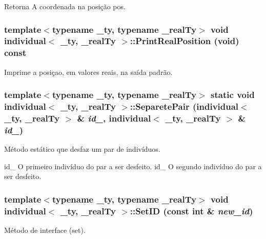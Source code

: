 \begin{DoxyReturn}{Retorna}
A coordenada na posição pos. 
\end{DoxyReturn}
\hypertarget{classindividual_a19b73804838e239adf7eb78ac7d4495c}{
\subsubsection[{PrintRealPosition}]{\setlength{\rightskip}{0pt plus 5cm}template$<$typename \_\-ty, typename \_\-realTy$>$ void {\bf individual}$<$ \_\-ty, \_\-realTy $>$::PrintRealPosition (void) const}}
\label{classindividual_a19b73804838e239adf7eb78ac7d4495c}
Imprime a posiçao, em valores reais, na saída padrão. \hypertarget{classindividual_a3f064fc3cf1612ef6cd2ffda4cb7610c}{
\subsubsection[{SeparetePair}]{\setlength{\rightskip}{0pt plus 5cm}template$<$typename \_\-ty, typename \_\-realTy$>$ static void {\bf individual}$<$ \_\-ty, \_\-realTy $>$::SeparetePair ({\bf individual}$<$ \_\-ty, \_\-realTy $>$ \& {\em id\_}, \/  {\bf individual}$<$ \_\-ty, \_\-realTy $>$ \& {\em id\_})}}
\label{classindividual_a3f064fc3cf1612ef6cd2ffda4cb7610c}
Método estático que desfaz um par de indivíduos.

id\_ O primeiro indivíduo do par a ser desfeito.  id\_ O segundo indivíduo do par a ser desfeito. \hypertarget{classindividual_aa9650e911651d6656cbd44f0d9344aaf}{
\subsubsection[{SetID}]{\setlength{\rightskip}{0pt plus 5cm}template$<$typename \_\-ty, typename \_\-realTy$>$ void {\bf individual}$<$ \_\-ty, \_\-realTy $>$::SetID (const int \& {\em new\_\-id})}}
\label{classindividual_aa9650e911651d6656cbd44f0d9344aaf}
Método de interface (set).

